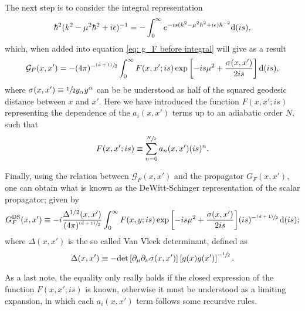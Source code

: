 The next step is to consider the integral representation
\begin{equation}
	\hbar^2(k^2-\mu^2\hbar^2+i\epsilon)^{-1}=-\int_0^\infty e^{-is(k^2-\mu^2\hbar^2+i\epsilon)\hbar^{-2}}\text{d}(is),
\end{equation}
which, when added into equation \ref{eq: g_F before integral} will give as a result
\begin{equation}
	\mathcal{G}_F(x,x')=-(4\pi)^{-\sfrac{(d+1)}{2}}\int_0^\infty F(x,x';is)\exp{\left[-is\mu^2+\frac{\sigma(x,x')}{2is}\right]}\,\text{d}(is),
\end{equation}
where $\sigma(x,x')\equiv\sfrac{1}{2}y_\alpha y^\alpha$ can be be understood as half of the squared geodesic distance between $x$ and $x'$. Here we have introduced the function $F(x,x';is)$ representing the dependence of the $a_i(x,x')$ terms up to an adiabatic order $N$, such that
\begin{equation}
	F(x,x';is)\equiv \sum_{n=0}^{\sfrac{N}{2}}a_n(x,x')(is)^n.
\end{equation}

Finally, using the relation between $\mathcal{G}_F(x,x')$ and the propagator $G_F(x,x')$, one can obtain what is known as the DeWitt-Schinger representation of the scalar propagator; given by
\begin{equation}
	G_F^{\text{DS}}(x,x')\equiv -i\frac{\Delta^{1/2}(x,x')}{(4\pi)^{\sfrac{(d+1)}{2}}}\int^\infty_0F(x,y;is)\exp{\left[-is\mu^2+\frac{\sigma(x,x')}{2is}\right]}(is)^{-\sfrac{(d+1)}{2}}\,\text{d} (is);
\end{equation}
where $\Delta(x,x')$ is the so called Van Vleck determinant, defined as 
\begin{equation}
	\Delta(x,x')\equiv -\text{det}\left[\partial_\mu\partial_\nu\sigma(x,x')\right]\left[g(x)g(x')\right]^{-\sfrac{1}{2}}.
\end{equation}

As a last note, the equality only really holds if the closed expression of the function $F(x,x';is)$ is known, otherwise it must be understood as a limiting expansion, in which each $a_i(x,x')$ term follows some recursive rules.